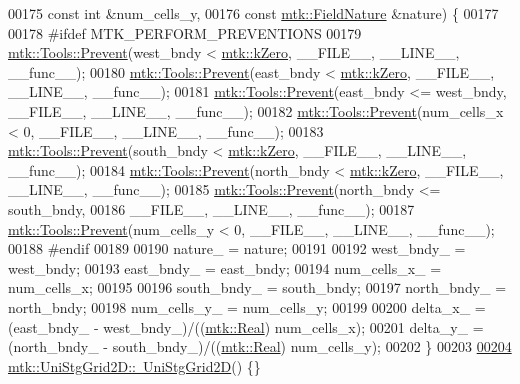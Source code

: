 \begin{DoxyCode}
00175                                 \textcolor{keyword}{const} \textcolor{keywordtype}{int} &num\_cells\_y,
00176                                 \textcolor{keyword}{const} \hyperlink{group__c02-enums_ga4c54f2a329cfb4e56213b02a259d19e2}{mtk::FieldNature} &nature) \{
00177 
00178 \textcolor{preprocessor}{  #ifdef MTK\_PERFORM\_PREVENTIONS}
00179   \hyperlink{classmtk_1_1Tools_a332324c6f25e66be9dff48c5987a3b9f}{mtk::Tools::Prevent}(west\_bndy < \hyperlink{group__c01-roots_ga59a451a5fae30d59649bcda274fea271}{mtk::kZero}, \_\_FILE\_\_, \_\_LINE\_\_, \_\_func\_\_);
00180   \hyperlink{classmtk_1_1Tools_a332324c6f25e66be9dff48c5987a3b9f}{mtk::Tools::Prevent}(east\_bndy < \hyperlink{group__c01-roots_ga59a451a5fae30d59649bcda274fea271}{mtk::kZero}, \_\_FILE\_\_, \_\_LINE\_\_, \_\_func\_\_);
00181   \hyperlink{classmtk_1_1Tools_a332324c6f25e66be9dff48c5987a3b9f}{mtk::Tools::Prevent}(east\_bndy <= west\_bndy, \_\_FILE\_\_, \_\_LINE\_\_, \_\_func\_\_);
00182   \hyperlink{classmtk_1_1Tools_a332324c6f25e66be9dff48c5987a3b9f}{mtk::Tools::Prevent}(num\_cells\_x < 0, \_\_FILE\_\_, \_\_LINE\_\_, \_\_func\_\_);
00183   \hyperlink{classmtk_1_1Tools_a332324c6f25e66be9dff48c5987a3b9f}{mtk::Tools::Prevent}(south\_bndy < \hyperlink{group__c01-roots_ga59a451a5fae30d59649bcda274fea271}{mtk::kZero}, \_\_FILE\_\_, \_\_LINE\_\_, \_\_func\_\_);
00184   \hyperlink{classmtk_1_1Tools_a332324c6f25e66be9dff48c5987a3b9f}{mtk::Tools::Prevent}(north\_bndy < \hyperlink{group__c01-roots_ga59a451a5fae30d59649bcda274fea271}{mtk::kZero}, \_\_FILE\_\_, \_\_LINE\_\_, \_\_func\_\_);
00185   \hyperlink{classmtk_1_1Tools_a332324c6f25e66be9dff48c5987a3b9f}{mtk::Tools::Prevent}(north\_bndy <= south\_bndy,
00186                       \_\_FILE\_\_, \_\_LINE\_\_, \_\_func\_\_);
00187   \hyperlink{classmtk_1_1Tools_a332324c6f25e66be9dff48c5987a3b9f}{mtk::Tools::Prevent}(num\_cells\_y < 0, \_\_FILE\_\_, \_\_LINE\_\_, \_\_func\_\_);
00188 \textcolor{preprocessor}{  #endif}
00189 
00190   nature\_ = nature;
00191 
00192   west\_bndy\_ = west\_bndy;
00193   east\_bndy\_ = east\_bndy;
00194   num\_cells\_x\_ = num\_cells\_x;
00195 
00196   south\_bndy\_ = south\_bndy;
00197   north\_bndy\_ = north\_bndy;
00198   num\_cells\_y\_ = num\_cells\_y;
00199 
00200   delta\_x\_ = (east\_bndy\_ - west\_bndy\_)/((\hyperlink{group__c01-roots_gac080bbbf5cbb5502c9f00405f894857d}{mtk::Real}) num\_cells\_x);
00201   delta\_y\_ = (north\_bndy\_ - south\_bndy\_)/((\hyperlink{group__c01-roots_gac080bbbf5cbb5502c9f00405f894857d}{mtk::Real}) num\_cells\_y);
00202 \}
00203 
\hypertarget{mtk__uni__stg__grid__2d_8cc_source_l00204}{}\hyperlink{classmtk_1_1UniStgGrid2D_a55615fed9674be8d8a48a1105e5a1476}{00204} \hyperlink{classmtk_1_1UniStgGrid2D_a55615fed9674be8d8a48a1105e5a1476}{mtk::UniStgGrid2D::~UniStgGrid2D}() \{\}

\end{DoxyCode}
